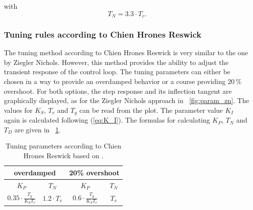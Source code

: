 with
\begin{equation}
    T_{N}  = 3.3\cdot T_{v}.
 \label{eq:T_N_zn}
\end{equation}

\subsubsection{Tuning rules according to Chien Hrones Reswick}\label{chap:CHR}
The tuning method according to Chien Hrones Reswick is very similar to the one by Ziegler Nichols. However, this method provides the ability to adjust the transient response of the control loop. The tuning parameters can either be chosen in a way to provide an overdamped behavior or a course providing $20\, \%$ overshoot. \cite{Reg_11}
For both options, the step response and its inflection tangent are graphically displayed, as for the Ziegler Nichols approach in \figurename~\ref{fig:param_zn}.
The values for $K_{S}$, $T_{v}$ and $T_{g}$ can be read from the plot. The parameter value $K_{I}$ again is calculated following (\ref{eq:K_I}). The formulas for calculating  $K_{P}$,  $T_{N}$ and $T_{D}$ are given in \tablename~\ref{tab:param_chr}.

\begin{table}[ht]
  \centering
  \begin{tabular}{cc|cc}
    \toprule
     \multicolumn{2}{c|}{overdamped} & \multicolumn{2}{c}{20\% overshoot} \\
    \midrule
    $K_{P}$ &  $T_{N}$ & $K_{P}$ &  $T_{N}$ \\
    \midrule
     $0.35 \cdot \frac{T_{g}}{K_{S}T_{v}}$ & $1.2 \cdot T_{v}$  & $0.6 \cdot \frac{T_{g}}{K_{S}T_{v}}$ & $T_{v}$ \\
    \bottomrule
\end{tabular}
  \caption[Tuning parameters according to Chien Hrones Reswick]{Tuning parameters according to Chien Hrones Reswick based on \cite{Reg_17}.}
  \label{tab:param_chr}
\end{table}

